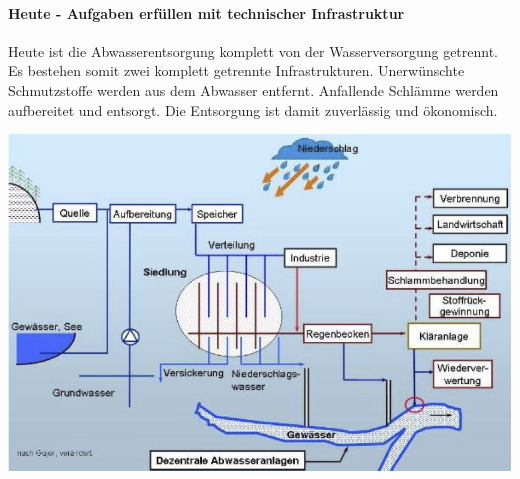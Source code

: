\documentclass[9pt, openright=false]{scrartcl}
\begin{document}
\paragraph{Heute - Aufgaben erfüllen mit technischer Infrastruktur} Heute ist die Abwasserentsorgung komplett von der Wasserversorgung getrennt. Es bestehen somit zwei komplett getrennte Infrastrukturen. Unerwünschte Schmutzstoffe werden aus dem Abwasser entfernt. Anfallende Schlämme werden aufbereitet und entsorgt. Die Entsorgung ist damit zuverlässig und ökonomisch.\\
\begin{center}
\includegraphics[width=.6\textwidth]{images/netze}
\end{center}
\end{document}
